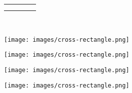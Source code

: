 \documentclass[10pt,]{article}
\theoremstyle{plain}
\theoremstyle{definition}
\theoremstyle{definition}
\theoremstyle{definition}
\theoremstyle{definition}
\theoremstyle{definition}
\theoremstyle{definition}
\numberwithin{equation}{section}
\newlength{\panelmax}
\begin{document}
{\begin{tabular}{@{}*{4}{c}@{}}
\begin{minipage}[c][\panelmax][t]{0.2\linewidth}\usebox{\panelboxCimage}\end{minipage}&
\begin{minipage}[c][\panelmax][t]{0.2\linewidth}\usebox{\panelboxDimage}\end{minipage}\tabularnewline
\parbox[t]{0.2\linewidth}{
}&
\parbox[t]{0.2\linewidth}{
}&
\parbox[t]{0.2\linewidth}{
}&
\parbox[t]{0.2\linewidth}{
}\end{tabular}\\
}%
{%
\setlength{\panelmax}{0pt}
\ifdefined\panelboxAimage\else\newsavebox{\panelboxAimage}\fi%
\begin{lrbox}{\panelboxAimage}
\texttt{[image: images/cross-rectangle.png]}
\end{lrbox}
\ifdefined\phAimage\else\newlength{\phAimage}\fi%
\setlength{\phAimage}{\ht\panelboxAimage+\dp\panelboxAimage}
\settototalheight{\phAimage}{\usebox{\panelboxAimage}}
\setlength{\panelmax}{\maxof{\panelmax}{\phAimage}}
\ifdefined\panelboxBimage\else\newsavebox{\panelboxBimage}\fi%
\begin{lrbox}{\panelboxBimage}
\texttt{[image: images/cross-rectangle.png]}
\end{lrbox}
\ifdefined\phBimage\else\newlength{\phBimage}\fi%
\setlength{\phBimage}{\ht\panelboxBimage+\dp\panelboxBimage}
\settototalheight{\phBimage}{\usebox{\panelboxBimage}}
\setlength{\panelmax}{\maxof{\panelmax}{\phBimage}}
\ifdefined\panelboxCimage\else\newsavebox{\panelboxCimage}\fi%
\begin{lrbox}{\panelboxCimage}
\texttt{[image: images/cross-rectangle.png]}
\end{lrbox}
\ifdefined\phCimage\else\newlength{\phCimage}\fi%
\setlength{\phCimage}{\ht\panelboxCimage+\dp\panelboxCimage}
\settototalheight{\phCimage}{\usebox{\panelboxCimage}}
\setlength{\panelmax}{\maxof{\panelmax}{\phCimage}}
\ifdefined\panelboxDimage\else\newsavebox{\panelboxDimage}\fi%
\begin{lrbox}{\panelboxDimage}
\texttt{[image: images/cross-rectangle.png]}
\end{lrbox}
}
\end{document}
